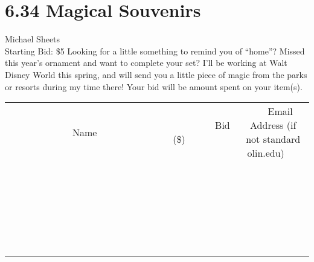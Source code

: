 \documentclass[11pt]{article}
\begin{document}
\section*{6.34 Magical Souvenirs}
Michael Sheets
\\
Starting Bid: \$5
\newline
Looking for a little something to remind you of “home”? Missed this year’s ornament and want to complete your set? I’ll be working at Walt Disney World this spring, and will send you a little piece of magic from the parks or resorts during my time there! Your bid will be amount spent on your item(s).
\\[6ex]
\begin{tabular}{c c c}
~~~~~~~~~~~~~Name~~~~~~~~~~~~~ & ~~~~~~~~~Bid (\$)~~~~~~~~~  & ~~~Email Address (if not standard olin.edu)~~~\\
 & & \\
\hline
 & & \\
\hline
 & & \\
\hline
 & & \\
\hline
 & & \\
\hline
 & & \\
\hline
 & & \\
\hline
 & & \\
\hline
 & & \\
\hline
 & & \\
\hline
 & & \\
\hline
 & & \\
\hline
 & & \\
\hline
 & & \\
\hline
 & & \\
\hline
 & & \\
\hline
 & & \\
\hline
 & & \\
\hline
 & & \\
\hline
 & & \\
\hline
 & & \\
\hline
 & & \\
\hline
 & & \\
\hline
 & & \\
\hline
 & & \\
\hline
 & & \\
\hline
\end{tabular}
\newpage
\end{document}
